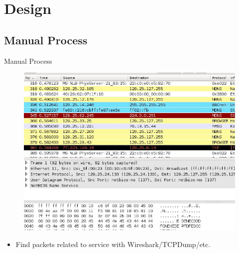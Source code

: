\documentclass{beamer}
\begin{document}

\section{Design}
\subsection{Manual Process}
\begin{frame}{Manual Process}
    \begin{figure}
        \centering
        \includegraphics[width=.75\textwidth]{gfx/wireshark}
    \end{figure}
    \begin{itemize}
        \item Find packets related to service with Wireshark/TCPDump/etc.
    \end{itemize}
\end{frame}

\end{document}
